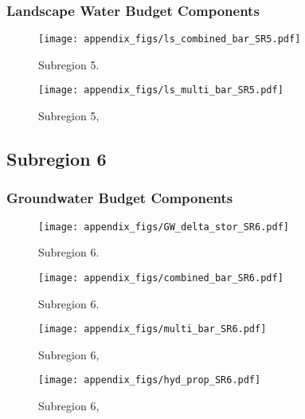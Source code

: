\subsubsection{Landscape Water Budget Components}
\begin{figure}[ht]
\centerline{\texttt{[image: appendix\_figs/ls\_combined\_bar\_SR5.pdf]}}
\caption{\LSCombinedTextOne Subregion 5.\LSCombinedTextTwo}
\label{fig:LS_budget_SR5}
\end{figure}
\newpage

\begin{landscape}
\begin{figure}[ht]
\centerline{\texttt{[image: appendix\_figs/ls\_multi\_bar\_SR5.pdf]}}
\caption{\LSMultiTextOne Subregion 5,\LSMultiTextTwo}
\label{fig:multi_LS_budget_SR5}
\end{figure}
\newpage
\end{landscape}

\subsection{Subregion 6}
\subsubsection{Groundwater Budget Components}
\begin{figure}[h]
\centerline{\texttt{[image: appendix\_figs/GW\_delta\_stor\_SR6.pdf]}}
\caption{\GWBudgetText Subregion 6.}
\label{fig:delta_stor_SR6}
\end{figure}
\newpage

\begin{figure}[ht]
\centerline{\texttt{[image: appendix\_figs/combined\_bar\_SR6.pdf]}}
\caption{\GWCombinedTextOne Subregion 6.\GWCombinedTextTwo}
\label{fig:GW_budget_SR6}
\end{figure}
\newpage

\begin{landscape}
\begin{figure}[ht]
\centerline{\texttt{[image: appendix\_figs/multi\_bar\_SR6.pdf]}}
\caption{\GWMultiTextOne Subregion 6,\GWMultiTextTwo}
\label{fig:multi_GW_budget_SR6}
\end{figure}
\newpage

\begin{figure}[ht]
\centerline{\texttt{[image: appendix\_figs/hyd\_prop\_SR6.pdf]}}
\caption{\HydPropOne Subregion 6,\HydPropTwo}
\label{fig:hyd_prop_SR6}
\end{figure}
\newpage
\end{landscape}

